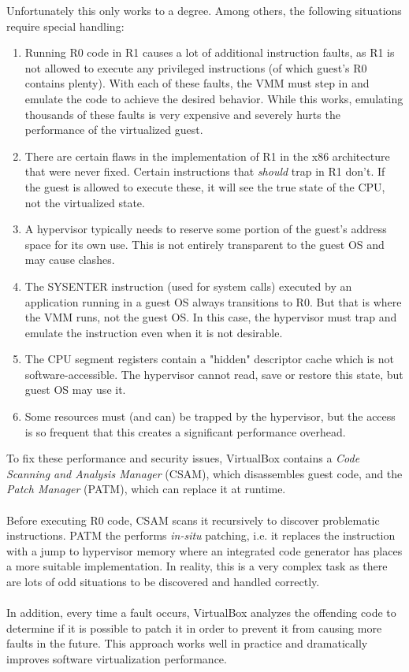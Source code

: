 \documentclass[a4paper, 12pt, titlepage]{report}
\begin{document}
Unfortunately this only works to a degree. Among others, the following situations require special handling:
\begin{enumerate}
\item Running R0 code in R1 causes a lot of additional instruction faults, as R1 is not allowed to execute any privileged instructions (of which guest's R0 contains plenty). With each of these faults, the VMM must step in and emulate the code to achieve the desired behavior. While this works, emulating thousands of these faults is very expensive and severely hurts the performance of the virtualized guest.
\item There are certain flaws in the implementation of R1 in the x86 architecture that were never fixed. Certain instructions that \textit{should} trap in R1 don't. If the guest is allowed to execute these, it will see the true state of the CPU, not the virtualized state.
\item A hypervisor typically needs to reserve some portion of the guest's address space for its own use. This is not entirely transparent to the guest OS and may cause clashes.
\item The SYSENTER instruction (used for system calls) executed by an application running in a guest OS always transitions to R0. But that is where the VMM runs, not the guest OS. In this case, the hypervisor must trap and emulate the instruction even when it is not desirable.
\item The CPU segment registers contain a "hidden" descriptor cache which is not software-accessible. The hypervisor cannot read, save or restore this state, but guest OS may use it.
\item Some resources must (and can) be trapped by the hypervisor, but the access is so frequent that this creates a significant performance overhead.
\end{enumerate}
To fix these performance and security issues, VirtualBox contains a \textit{Code Scanning and Analysis Manager} (CSAM), which disassembles guest code, and the \textit{Patch Manager} (PATM), which can replace it at runtime.
\\
\\
Before executing R0 code, CSAM scans it recursively to discover problematic instructions. PATM the performs \textit{in-situ} patching, i.e. it replaces the instruction with a jump to hypervisor memory where an integrated code generator has places a more suitable implementation. In reality, this is a very complex task as there are lots of odd situations to be discovered and handled correctly.
\\
\\
In addition, every time a fault occurs, VirtualBox analyzes the offending code to determine if it is possible to patch it in order to prevent it from causing more faults in the future. This approach works well in practice and dramatically improves software virtualization performance.
\end{document}
